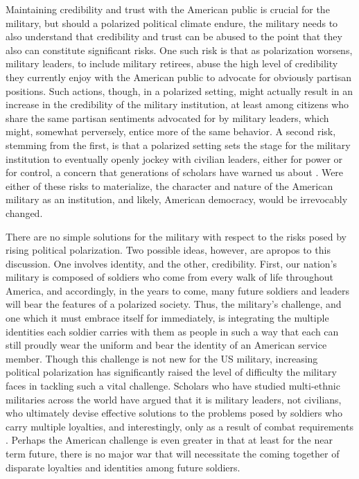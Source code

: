\documentclass[12pt,]{article}
\begin{document}
Maintaining credibility and trust with the American public is crucial for the military, but should a polarized political climate endure, the military needs to also understand that credibility and trust can be abused to the point that they also can constitute significant risks. One such risk is that as polarization worsens, military leaders, to include military retirees, abuse the high level of credibility they currently enjoy with the American public to advocate for obviously partisan positions. Such actions, though, in a polarized setting, might actually result in an increase in the credibility of the military institution, at least among citizens who share the same partisan sentiments advocated for by military leaders, which might, somewhat perversely, entice more of the same behavior. A second risk, stemming from the first, is that a polarized setting sets the stage for the military institution to eventually openly jockey with civilian leaders, either for power or for control, a concern that generations of scholars have warned us about \autocites{finer_man_1962}{brooks_shaping_2008-1}. Were either of these risks to materialize, the character and nature of the American military as an institution, and likely, American democracy, would be irrevocably changed.

There are no simple solutions for the military with respect to the risks posed by rising political polarization. Two possible ideas, however, are apropos to this discussion. One involves identity, and the other, credibility. First, our nation's military is composed of soldiers who come from every walk of life throughout America, and accordingly, in the years to come, many future soldiers and leaders will bear the features of a polarized society. Thus, the military's challenge, and one which it must embrace itself for immediately, is integrating the multiple identities each soldier carries with them as people in such a way that each can still proudly wear the uniform and bear the identity of an American service member. Though this challenge is not new for the US military, increasing political polarization has significantly raised the level of difficulty the military faces in tackling such a vital challenge. Scholars who have studied multi-ethnic militaries across the world have argued that it is military leaders, not civilians, who ultimately devise effective solutions to the problems posed by soldiers who carry multiple loyalties, and interestingly, only as a result of combat requirements \autocite{peled_question_1998}. Perhaps the American challenge is even greater in that at least for the near term future, there is no major war that will necessitate the coming together of disparate loyalties and identities among future soldiers.
\end{document}
